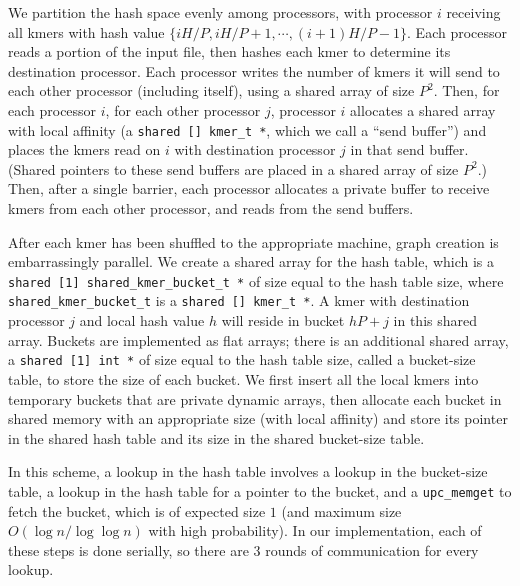 \documentclass{article}
\begin{document}
We partition the hash space evenly among processors, with processor $i$ receiving all kmers with hash value $\{iH/P, iH/P+1, \cdots, (i+1)H/P-1\}$.  Each processor reads a portion of the input file, then hashes each kmer to determine its destination processor.  Each processor writes the number of kmers it will send to each other processor (including itself), using a shared array of size $P^2$.  Then, for each processor $i$, for each other processor $j$, processor $i$ allocates a shared array with local affinity (a \texttt{shared [] kmer\_t *}, which we call a ``send buffer'') and places the kmers read on $i$ with destination processor $j$ in that send buffer.  (Shared pointers to these send buffers are placed in a shared array of size $P^2$.)  Then, after a single barrier, each processor allocates a private buffer to receive kmers from each other processor, and reads from the send buffers.

After each kmer has been shuffled to the appropriate machine, graph creation is embarrassingly parallel.  We create a shared array for the hash table, which is a \texttt{shared [1] shared\_kmer\_bucket\_t *} of size equal to the hash table size, where \texttt{shared\_kmer\_bucket\_t} is a \texttt{shared [] kmer\_t *}.  A kmer with destination processor $j$ and local hash value $h$ will reside in bucket $hP+j$ in this shared array.  Buckets are implemented as flat arrays; there is an additional shared array, a \texttt{shared [1] int *} of size equal to the hash table size, called a bucket-size table, to store the size of each bucket.  We first insert all the local kmers into temporary buckets that are private dynamic arrays, then allocate each bucket in shared memory with an appropriate size (with local affinity) and store its pointer in the shared hash table and its size in the shared bucket-size table.

In this scheme, a lookup in the hash table involves a lookup in the bucket-size table, a lookup in the hash table for a pointer to the bucket, and a \texttt{upc\_memget} to fetch the bucket, which is of expected size $1$ (and maximum size $O(\log n / \log \log n)$ with high probability).  In our implementation, each of these steps is done serially, so there are $3$ rounds of communication for every lookup.
\end{document}

